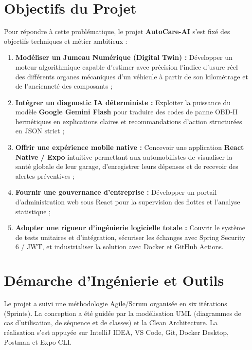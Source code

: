 \documentclass[12pt,a4paper,oneside]{report}
\begin{document}
\section*{Objectifs du Projet}
Pour r\'epondre \`a cette probl\'ematique, le projet \textbf{AutoCare-AI} s'est fix\'e des objectifs techniques et m\'etier ambitieux :
\begin{enumerate}[label=\textbf{\arabic*.}]
  \item \textbf{Mod\'eliser un Jumeau Num\'erique (Digital Twin) :} D\'evelopper un moteur algorithmique capable d'estimer avec pr\'ecision l'indice d'usure r\'eel des diff\'erents organes m\'ecaniques d'un v\'ehicule \`a partir de son kilom\'etrage et de l'anciennet\'e des composants ;
  \item \textbf{Int\'egrer un diagnostic IA d\'eterministe :} Exploiter la puissance du mod\`ele \textbf{Google Gemini Flash} pour traduire des codes de panne OBD-II herm\'etiques en explications claires et recommandations d'action structur\'ees en JSON strict ;
  \item \textbf{Offrir une exp\'erience mobile native :} Concevoir une application \textbf{React Native / Expo} intuitive permettant aux automobilistes de visualiser la sant\'e globale de leur garage, d'enregistrer leurs d\'epenses et de recevoir des alertes pr\'eventives ;
  \item \textbf{Fournir une gouvernance d'entreprise :} D\'evelopper un portail d'administration web sous React pour la supervision des flottes et l'analyse statistique ;
  \item \textbf{Adopter une rigueur d'ing\'enierie logicielle totale :} Couvrir le syst\`eme de tests unitaires et d'int\'egration, s\'ecuriser les \'echanges avec Spring Security 6 / JWT, et industrialiser la solution avec Docker et GitHub Actions.
\end{enumerate}

\section*{D\'emarche d'Ing\'enierie et Outils}
Le projet a suivi une m\'ethodologie Agile/Scrum organis\'ee en six it\'erations (Sprints). La conception a \'et\'e guid\'ee par la mod\'elisation UML (diagrammes de cas d'utilisation, de s\'equence et de classes) et la Clean Architecture. La r\'ealisation s'est appuy\'ee sur IntelliJ IDEA, VS Code, Git, Docker Desktop, Postman et Expo CLI.
\end{document}
